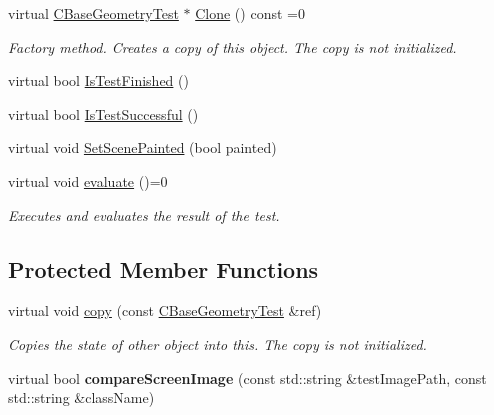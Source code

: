 \begin{DoxyCompactItemize}
virtual \mbox{\hyperlink{class_unit_test_1_1_c_base_geometry_test}{C\+Base\+Geometry\+Test}} $\ast$ \mbox{\hyperlink{class_unit_test_1_1_c_base_geometry_test_a8842760fc0c3523c870c27cf4da991d3}{Clone}} () const =0
\begin{DoxyCompactList}\small\item\em Factory method. Creates a copy of this object. The copy is not initialized. \end{DoxyCompactList}\item 
virtual bool \mbox{\hyperlink{class_unit_test_1_1_c_base_geometry_test_a83d1fcc53bda24eca6933acf5bd3162c}{Is\+Test\+Finished}} ()
\item 
virtual bool \mbox{\hyperlink{class_unit_test_1_1_c_base_geometry_test_aa824a0d8affc72e8bc68616dc38f0961}{Is\+Test\+Successful}} ()
\item 
virtual void \mbox{\hyperlink{class_unit_test_1_1_c_base_geometry_test_a394a19d424a416ade87e4d09978337bf}{Set\+Scene\+Painted}} (bool painted)
\item 
\mbox{\label{class_unit_test_1_1_c_base_geometry_test_aa8b1294602af974787093218f1c00fa0}} 
virtual void \mbox{\hyperlink{class_unit_test_1_1_c_base_geometry_test_aa8b1294602af974787093218f1c00fa0}{evaluate}} ()=0
\begin{DoxyCompactList}\small\item\em Executes and evaluates the result of the test. \end{DoxyCompactList}\end{DoxyCompactItemize}
\subsection*{Protected Member Functions}
\begin{DoxyCompactItemize}
\item 
\mbox{\label{class_unit_test_1_1_c_base_geometry_test_a6f63dbd1078673b0aef45573fbb01a81}} 
virtual void \mbox{\hyperlink{class_unit_test_1_1_c_base_geometry_test_a6f63dbd1078673b0aef45573fbb01a81}{copy}} (const \mbox{\hyperlink{class_unit_test_1_1_c_base_geometry_test}{C\+Base\+Geometry\+Test}} \&ref)
\begin{DoxyCompactList}\small\item\em Copies the state of other object into this. The copy is not initialized. \end{DoxyCompactList}\item 
\mbox{\label{class_unit_test_1_1_c_base_geometry_test_af45fb93e1001f5537c7552796849a6bc}} 
virtual bool {\bfseries compare\+Screen\+Image} (const std\+::string \&test\+Image\+Path, const std\+::string \&class\+Name)
\end{DoxyCompactItemize}
